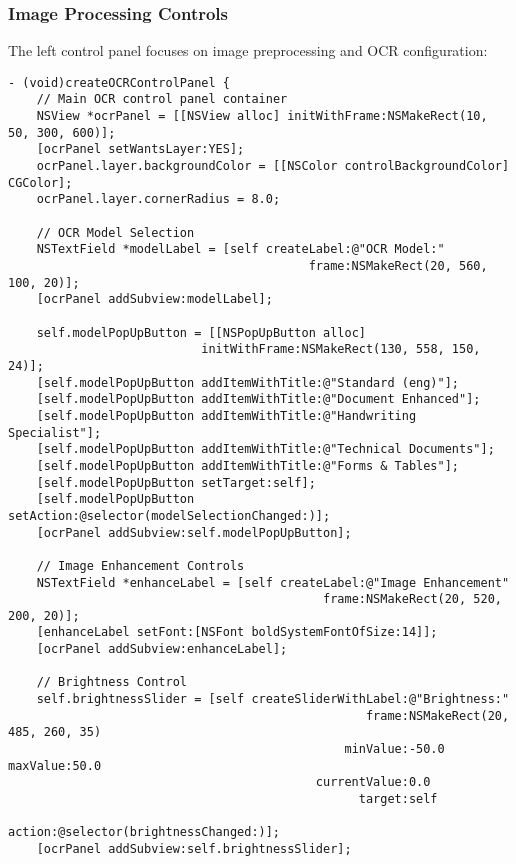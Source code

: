 \subsubsection{Image Processing Controls}

The left control panel focuses on image preprocessing and OCR configuration:

\begin{verbatim}
- (void)createOCRControlPanel {
    // Main OCR control panel container
    NSView *ocrPanel = [[NSView alloc] initWithFrame:NSMakeRect(10, 50, 300, 600)];
    [ocrPanel setWantsLayer:YES];
    ocrPanel.layer.backgroundColor = [[NSColor controlBackgroundColor] CGColor];
    ocrPanel.layer.cornerRadius = 8.0;
    
    // OCR Model Selection
    NSTextField *modelLabel = [self createLabel:@"OCR Model:" 
                                          frame:NSMakeRect(20, 560, 100, 20)];
    [ocrPanel addSubview:modelLabel];
    
    self.modelPopUpButton = [[NSPopUpButton alloc] 
                           initWithFrame:NSMakeRect(130, 558, 150, 24)];
    [self.modelPopUpButton addItemWithTitle:@"Standard (eng)"];
    [self.modelPopUpButton addItemWithTitle:@"Document Enhanced"];
    [self.modelPopUpButton addItemWithTitle:@"Handwriting Specialist"];
    [self.modelPopUpButton addItemWithTitle:@"Technical Documents"];
    [self.modelPopUpButton addItemWithTitle:@"Forms & Tables"];
    [self.modelPopUpButton setTarget:self];
    [self.modelPopUpButton setAction:@selector(modelSelectionChanged:)];
    [ocrPanel addSubview:self.modelPopUpButton];
    
    // Image Enhancement Controls
    NSTextField *enhanceLabel = [self createLabel:@"Image Enhancement" 
                                            frame:NSMakeRect(20, 520, 200, 20)];
    [enhanceLabel setFont:[NSFont boldSystemFontOfSize:14]];
    [ocrPanel addSubview:enhanceLabel];
    
    // Brightness Control
    self.brightnessSlider = [self createSliderWithLabel:@"Brightness:" 
                                                  frame:NSMakeRect(20, 485, 260, 35)
                                               minValue:-50.0 maxValue:50.0 
                                           currentValue:0.0
                                                 target:self
                                                 action:@selector(brightnessChanged:)];
    [ocrPanel addSubview:self.brightnessSlider];
    

\end{verbatim}
